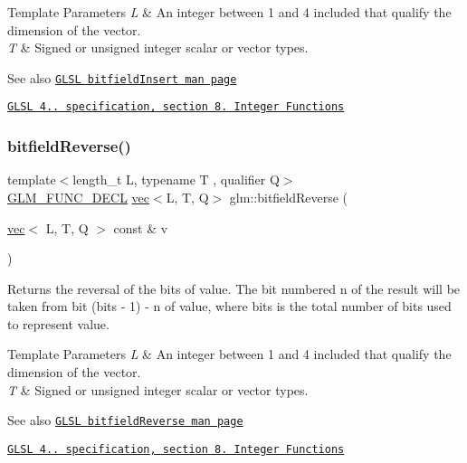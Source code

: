 \begin{DoxyTemplParams}{Template Parameters}
{\em L} & An integer between 1 and 4 included that qualify the dimension of the vector. \\
\hline
{\em T} & Signed or unsigned integer scalar or vector types.\\
\hline
\end{DoxyTemplParams}
\begin{DoxySeeAlso}{See also}
\href{http://www.opengl.org/sdk/docs/manglsl/xhtml/bitfieldInsert.xml}{\tt G\+L\+SL bitfield\+Insert man page} 

\href{http://www.opengl.org/registry/doc/GLSLangSpec.4.20.8.pdf}{\tt G\+L\+SL 4.. specification, section 8. Integer Functions} 
\end{DoxySeeAlso}
\mbox{\label{group__core__func__integer_ga750a1d92464489b7711dee67aa3441b6}} 
\subsubsection{\texorpdfstring{bitfield\+Reverse()}{bitfieldReverse()}}
{\footnotesize\ttfamily template$<$length\+\_\+t L, typename T , qualifier Q$>$ \\
\mbox{\hyperlink{setup_8hpp_ab2d052de21a70539923e9bcbf6e83a51}{G\+L\+M\+\_\+\+F\+U\+N\+C\+\_\+\+D\+E\+CL}} \mbox{\hyperlink{structglm_1_1vec}{vec}}$<$L, T, Q$>$ glm\+::bitfield\+Reverse (\begin{DoxyParamCaption}\item[{\mbox{\hyperlink{structglm_1_1vec}{vec}}$<$ L, T, Q $>$ const \&}]{v }\end{DoxyParamCaption})}

Returns the reversal of the bits of value. The bit numbered n of the result will be taken from bit (bits -\/ 1) -\/ n of value, where bits is the total number of bits used to represent value.


\begin{DoxyTemplParams}{Template Parameters}
{\em L} & An integer between 1 and 4 included that qualify the dimension of the vector. \\
\hline
{\em T} & Signed or unsigned integer scalar or vector types.\\
\hline
\end{DoxyTemplParams}
\begin{DoxySeeAlso}{See also}
\href{http://www.opengl.org/sdk/docs/manglsl/xhtml/bitfieldReverse.xml}{\tt G\+L\+SL bitfield\+Reverse man page} 

\href{http://www.opengl.org/registry/doc/GLSLangSpec.4.20.8.pdf}{\tt G\+L\+SL 4.. specification, section 8. Integer Functions} 
\end{DoxySeeAlso}
\mbox{\label{group__core__func__integer_gaf74c4d969fa34ab8acb9d390f5ca5274}} 
